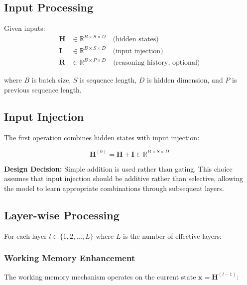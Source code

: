 \documentclass{article}
\begin{document}
\subsection{Input Processing}

Given inputs:
\begin{align}
\mathbf{H} &\in \mathbb{R}^{B \times S \times D} \quad \text{(hidden states)} \\
\mathbf{I} &\in \mathbb{R}^{B \times S \times D} \quad \text{(input injection)} \\
\mathbf{R} &\in \mathbb{R}^{B \times P \times D} \quad \text{(reasoning history, optional)}
\end{align}

where $B$ is batch size, $S$ is sequence length, $D$ is hidden dimension, and $P$ is previous sequence length.

\subsection{Input Injection}

The first operation combines hidden states with input injection:

\begin{equation}
\mathbf{H}^{(0)} = \mathbf{H} + \mathbf{I} \in \mathbb{R}^{B \times S \times D}
\end{equation}

\textbf{Design Decision:} Simple addition is used rather than gating. This choice assumes that input injection should be additive rather than selective, allowing the model to learn appropriate combinations through subsequent layers.

\subsection{Layer-wise Processing}

For each layer $l \in \{1, 2, \ldots, L\}$ where $L$ is the number of effective layers:

\subsubsection{Working Memory Enhancement}

The working memory mechanism operates on the current state $\mathbf{x} = \mathbf{H}^{(l-1)}$:
\end{document}
